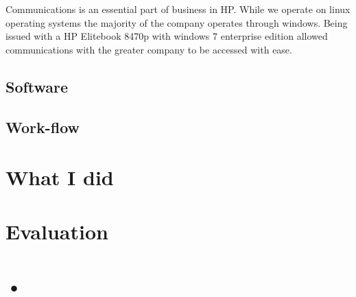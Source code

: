 \documentclass[11pt,a4paper]{report}
\begin{document}
Communications is an essential part of business in HP. While we operate on linux operating systems the majority of the company operates through windows. Being issued with a HP Elitebook 8470p with windows 7 enterprise edition allowed communications with the greater company to be accessed with ease. 


\subsection{Software}

\subsection{Work-flow}

\section{What I did}



\section{Evaluation}



\section{•}
\end{document}
